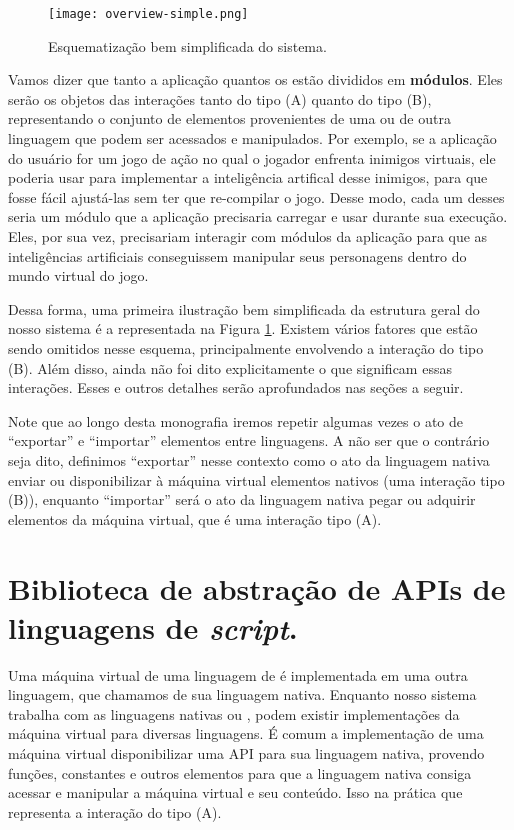     \begin{figure}[ht]
      \centering
      \texttt{[image: overview-simple.png]}
      \caption{Esquematização bem simplificada do sistema.}
      \label{fig:overview-simple}
    \end{figure}

    Vamos dizer que tanto a aplicação quantos os  estão divididos
    em \textbf{módulos}. Eles serão os objetos das interações tanto do tipo (A)
    quanto do tipo (B), representando o conjunto de elementos provenientes de
    uma ou de outra linguagem que podem ser acessados e manipulados. Por
    exemplo, se a aplicação do usuário for um jogo de ação no qual o jogador
    enfrenta inimigos virtuais, ele poderia usar  para implementar a
    inteligência artifical desse inimigos, para que fosse fácil ajustá-las sem
    ter que re-compilar o jogo. Desse modo, cada um desses  seria um
    módulo que a aplicação precisaria carregar e usar durante sua execução.
    Eles, por sua vez, precisariam interagir com módulos da aplicação para que
    as inteligências artificiais conseguissem manipular seus personagens dentro
    do mundo virtual do jogo.

    Dessa forma, uma primeira ilustração bem simplificada da estrutura geral do
    nosso sistema é a representada na Figura \ref{fig:overview-simple}. Existem
    vários fatores que estão sendo omitidos nesse esquema, principalmente
    envolvendo a interação do tipo (B). Além disso, ainda não foi dito
    explicitamente o que significam essas interações. Esses e outros detalhes
    serão aprofundados nas seções a seguir.
    
    Note que ao longo desta monografia iremos repetir algumas vezes o ato de
    ``exportar'' e ``importar'' elementos entre linguagens. A não ser que o
    contrário seja dito, definimos ``exportar'' nesse contexto como o ato
    da linguagem nativa enviar ou disponibilizar à máquina virtual elementos
    nativos (uma interação tipo (B)), enquanto ``importar'' será o ato
    da linguagem nativa pegar ou adquirir elementos da máquina virtual, que 
    é uma interação tipo (A).

  \section{Biblioteca de abstração de APIs de linguagens de \emph{script}.}
  \label{sec:estrutura:opa}
  
  Uma máquina virtual de uma linguagem de \script{} é implementada em uma outra
  linguagem, que chamamos de sua linguagem nativa. Enquanto nosso sistema trabalha
  com as linguagens nativas \C{} ou \CXX{}, podem existir implementações da máquina
  virtual para diversas linguagens. É comum a implementação de uma máquina virtual
  disponibilizar uma API para sua linguagem nativa, provendo funções, constantes
  e outros elementos para que a linguagem nativa consiga acessar e manipular a
  máquina virtual e seu conteúdo. Isso na prática que representa a interação do
  tipo (A).

